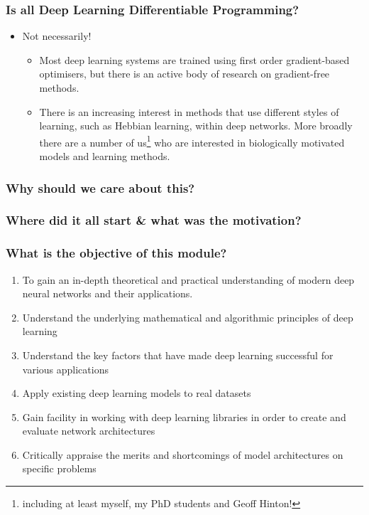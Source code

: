 \documentclass[\beamerclass]{beamer}
\begin{document}
\begin{frame}
\frametitle{Is all Deep Learning Differentiable Programming?}
\begin{itemize}
	\item Not necessarily!
	\begin{itemize}
		\item<+-> Most deep learning systems are trained using first order gradient-based optimisers, but there is an active body of research on gradient-free methods.
		\item<+-> There is an increasing interest in methods that use different styles of learning, such as Hebbian learning, within deep networks. More broadly there are a number of us\footnote{including at least myself, my PhD students and Geoff Hinton!} who are interested in biologically motivated models and learning methods.
	\end{itemize}
\end{itemize}
\end{frame}

\begin{frame}
	\frametitle{Why should we care about this?}
	
\end{frame}

\begin{frame}
	\frametitle{Where did it all start \& what was the motivation?}
	
\end{frame}

\begin{frame}
	\frametitle{What is the objective of this module?}
	\begin{enumerate}
		\item To gain an in-depth theoretical and practical understanding of modern deep neural networks and their applications.
		\item Understand the underlying mathematical and algorithmic principles of deep learning
		\item Understand the key factors that have made deep learning successful for various applications
		\item Apply existing deep learning models to real datasets
		\item Gain facility in working with deep learning libraries in order to create and evaluate network architectures
		\item Critically appraise the merits and shortcomings of model architectures on specific problems
	\end{enumerate}
\end{frame}
\end{document}
